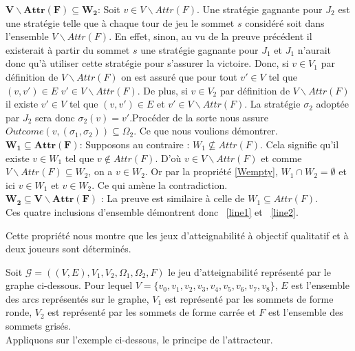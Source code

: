 \begin{demonstration}
		\noindent$\mathbf{V \backslash Attr(F) \subseteq W_{2}}$: Soit $v \in V \backslash Attr(F)$. Une stratégie gagnante pour $J_{2}$ est une stratégie telle que à chaque tour de jeu le sommet $s$ considéré soit dans l'ensemble $V\backslash Attr(F)$. En effet, sinon, au vu de la preuve précédent il existerait à partir du sommet $s$ une stratégie gagnante pour $J_{1}$ et $J_{1}$ n'aurait donc qu'à utiliser cette stratégie pour s'assurer la victoire. Donc, si $v \in V_{1}$ par définition de 	$V \backslash Attr(F)$ on est assuré que pour tout $v'\in V $ tel que $(v,v')\in E$ $v' \in V \backslash Attr(F)$. De plus, si $ v \in V_{2}$ par définition de $V \backslash Attr(F)$ il existe $v' \in V$ tel que $(v,v')\in E$ et $v' \in V \backslash Attr(F)$. La stratégie $\sigma _{2}$ adoptée par $J_{2}$ sera donc $\sigma _{2}(v)= v'$.Procéder de la sorte nous assure $Outcome(v,(\sigma _{1},\sigma _{2})) \subseteq \Omega _{2}$. Ce que nous voulions démontrer.\\
		
		\noindent $\mathbf{W_{1} \subseteq Attr(F)}$: Supposons au contraire : $W_{1} \not\subseteq Attr(F)$. Cela signifie qu'il existe $v \in W_{1}$ tel que $v \notin Attr(F)$. D'où $v \in V\backslash Attr(F)$ et comme $V \backslash Attr(F) \subseteq W_{2}$, on a $v \in W_{2}$. Or par la propriété \ref{Wempty}, $W_{1} \cap W_{2} = \emptyset $ et ici $v \in W_{1}$ et $v \in W_{2}$. Ce qui amène la contradiction.\\
		
		\noindent $\mathbf{W_{2} \subseteq V\backslash Attr(F)}$ : La preuve est similaire à celle de $W_{1} \subseteq Attr(F)$.\\
		
		Ces quatre inclusions d'ensemble démontrent donc ~\eqref{line1} et ~\eqref{line2}.
	\end{demonstration}
	\begin{rem}
		Cette propriété nous montre que les jeux d'atteignabilité à objectif qualitatif et à deux joueurs sont déterminés.
	\end{rem}
	

\begin{exemple}
Soit $\mathcal{G} = ((V,E),V_{1},V_{2},\Omega _{1}, \Omega _{2},F)$ le jeu d'atteignabilité représenté par le graphe ci-dessous. Pour lequel $V = \{ v_{0},v_{1},v_{2},v_{3},v_{4},v_{5},v_{6},v_{7},v_{8} \}$, $E$ est l'ensemble des arcs représentés sur le graphe, $V_{1}$ est représenté par les sommets de forme ronde, $V_{2}$ est représenté par les sommets de forme carrée et $F$ est l'ensemble des sommets grisés.\\
Appliquons sur l'exemple ci-dessous, le principe de l'attracteur.


\FloatBarrier
\end{exemple}

